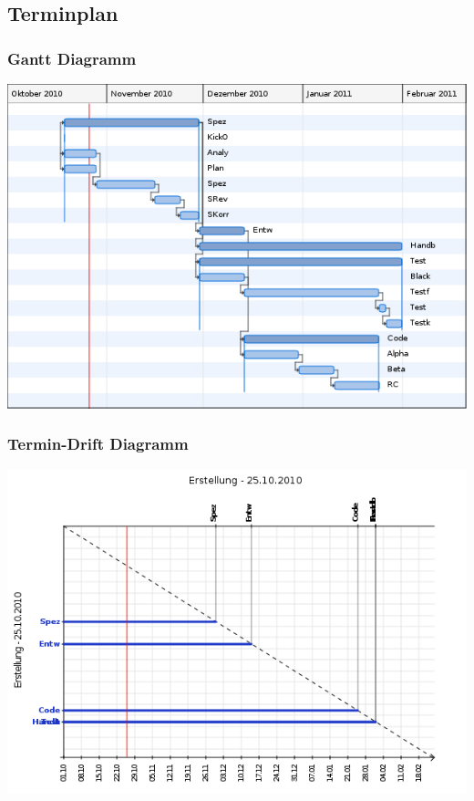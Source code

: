 \documentclass[a4paper,10pt]{scrartcl}
\begin{document}
\subsection{Terminplan}
\subsubsection{Gantt Diagramm}
\includegraphics[width=15cm]{gantt.png}
\subsubsection{Termin-Drift Diagramm}
\includegraphics[width=15cm]{termindrift.png}
\end{document}
